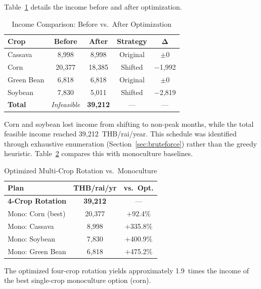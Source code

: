 \documentclass[conference]{IEEEtran}
\begin{document}
Table~\ref{tab:income_detail} details the income before and after optimization.

\begin{table}[htbp]
  \centering
  \caption{Income Comparison: Before vs.\ After Optimization}
  \label{tab:income_detail}
  \begin{tabular}{lcccc}
    \toprule
    \textbf{Crop} & \textbf{Before} & \textbf{After} & \textbf{Strategy} & $\boldsymbol{\Delta}$ \\
    \midrule
    Cassava    & 8,998  & 8,998  & Original & $\pm$0     \\
    Corn       & 20,377 & 18,385 & Shifted  & $-$1,992  \\
    Green Bean & 6,818  & 6,818  & Original & $\pm$0     \\
    Soybean    & 7,830  & 5,011  & Shifted  & $-$2,819  \\
    \midrule
    \textbf{Total} & \textit{Infeasible} & \textbf{39,212} & --- & --- \\
    \bottomrule
  \end{tabular}
\end{table}

Corn and soybean lost income from shifting to non-peak months, while the total feasible income reached 39,212~THB/rai/year. This schedule was identified through exhaustive enumeration (Section~\ref{sec:bruteforce}) rather than the greedy heuristic. Table~\ref{tab:mono} compares this with monoculture baselines.

\begin{table}[htbp]
  \centering
  \caption{Optimized Multi-Crop Rotation vs.\ Monoculture}
  \label{tab:mono}
  \begin{tabular}{lcc}
    \toprule
    \textbf{Plan} & \textbf{THB/rai/yr} & \textbf{vs.\ Opt.} \\
    \midrule
    \textbf{4-Crop Rotation} & \textbf{39,212} & --- \\
    Mono: Corn (best) & 20,377 & $+$92.4\% \\
    Mono: Cassava & 8,998 & $+$335.8\% \\
    Mono: Soybean & 7,830 & $+$400.9\% \\
    Mono: Green Bean & 6,818  & $+$475.2\% \\
    \bottomrule
  \end{tabular}
\end{table}

The optimized four-crop rotation yields approximately 1.9~times the income of the best single-crop monoculture option (corn).
\end{document}
